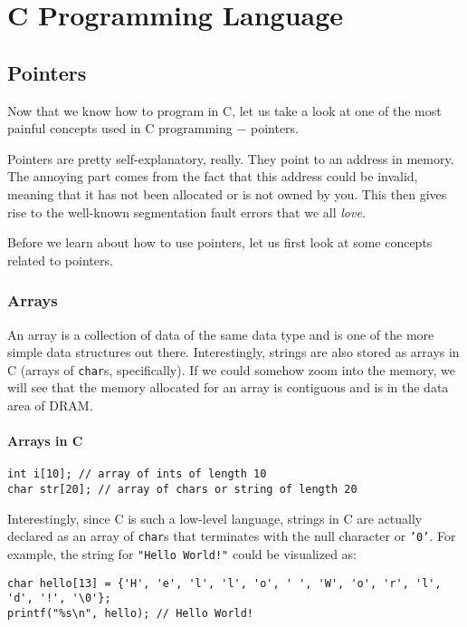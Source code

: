 \chapter{C Programming Language}

\section{Pointers}

Now that we know how to program in C, let us take a look at one
of the most painful concepts used in C programming $-$ pointers.

Pointers are pretty self-explanatory, really. They point to an 
address in memory. The annoying part comes from the fact that
this address could be invalid, meaning that it has not been
allocated or is not owned by you. This then gives rise to the
well-known segmentation fault errors that we all \textit{love}.

Before we learn about how to use pointers, let us first look at 
some concepts related to pointers.

\subsection{Arrays}

An array is a collection of data of the same data type and is
one of the more simple data structures out there. Interestingly,
strings are also stored as arrays in C (arrays of \texttt{char}s,
specifically). If we could somehow zoom into the memory, we will
see that the memory allocated for an array is contiguous and 
is in the data area of DRAM\@.

\subsubsection{Arrays in C}

\begin{verbatim}
int i[10]; // array of ints of length 10
char str[20]; // array of chars or string of length 20
\end{verbatim}

Interestingly, since C is such a low-level language, strings
in C are actually declared as an array of \texttt{char}s that
terminates with the null character or \texttt{'0'}.
For example, the string for \texttt{"Hello World!"} could be
visualized as:

\begin{verbatim}
char hello[13] = {'H', 'e', 'l', 'l', 'o', ' ', 'W', 'o', 'r', 'l', 'd', '!', '\0'};
printf("%s\n", hello); // Hello World!
\end{verbatim}

